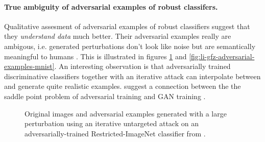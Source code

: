 \documentclass[twocolumn]{article}
\begin{document}
\paragraph{True ambiguity of adversarial examples of robust classifers.}
Qualitative assesment of adversarial examples of robust classifiers suggest that they \textit{understand data} much better. Their adversarial examples really are ambigous, i.e. generated perturbations don't look like noise but are semantically meaningful to humans \citep{Tsipras:2018:RMBOA,Li:2019:AGCMRAA}.  This is illustrated in figures \ref{fig:tsipras-robust-adversarial-examples} and \ref{fig:li-gfz-adversarial-examples-mnist}. An interesting observation is that adversarially trained discriminative classifiers together with an iterative attack can interpolate between and generate quite realistic examples. \citet{Tsipras:2018:RMBOA} suggest a connection between the the saddle point problem of adversarial training and GAN training \citep{Goodfellow:2014:GAN}.

\begin{figure}
	\begin{center}
	\end{center}
	\caption{Original images and adversarial examples generated with a large perturbation using an iterative untargeted attack on an adversarially-trained Restricted-ImageNet \citep{Tsipras:2018:RMBOA} classifier from \citet{Tsipras:2018:RMBOA}.}
	\label{fig:tsipras-robust-adversarial-examples}
\end{figure}
\end{document}
